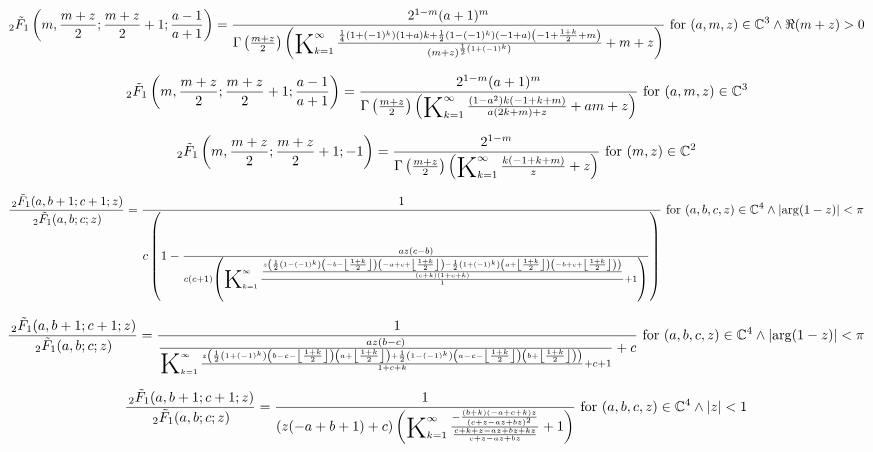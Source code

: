 \documentclass{article}
\newcommand{\bigK}{\mathop{\raisebox{-5pt}{\huge K}}}
\begin{document}
\[\, _2\tilde{F}_1\left(m,\frac{m+z}{2};\frac{m+z}{2}+1;\frac{a-1}{a+1}\right)=\frac{2^{1-m} (a+1)^m}{\Gamma \left(\frac{m+z}{2}\right) \left(\bigK_{k=1}^{\infty}\frac{\frac{1}{4} \left(1+(-1)^k\right) (1+a) k+\frac{1}{2} \left(1-(-1)^k\right) (-1+a) \left(-1+\frac{1+k}{2}+m\right)}{(m+z)^{\frac{1}{2} \left(1+(-1)^k\right)}}+m+z\right)}\text{ for }(a,m,z)\in \mathbb{C}^3\land \Re(m+z)>0\] 

\[\, _2\tilde{F}_1\left(m,\frac{m+z}{2};\frac{m+z}{2}+1;\frac{a-1}{a+1}\right)=\frac{2^{1-m} (a+1)^m}{\Gamma \left(\frac{m+z}{2}\right) \left(\bigK_{k=1}^{\infty}\frac{\left(1-a^2\right) k (-1+k+m)}{a (2 k+m)+z}+a m+z\right)}\text{ for }(a,m,z)\in \mathbb{C}^3\] 

\[\, _2\tilde{F}_1\left(m,\frac{m+z}{2};\frac{m+z}{2}+1;-1\right)=\frac{2^{1-m}}{\Gamma \left(\frac{m+z}{2}\right) \left(\bigK_{k=1}^{\infty}\frac{k (-1+k+m)}{z}+z\right)}\text{ for }(m,z)\in \mathbb{C}^2\] 

\[\frac{\, _2\tilde{F}_1(a,b+1;c+1;z)}{\, _2\tilde{F}_1(a,b;c;z)}=\frac{1}{c \left(1-\frac{a z (c-b)}{c (c+1) \left(\bigK_{k=1}^{\infty}\frac{\frac{z \left(\frac{1}{2} \left(1-(-1)^k\right) \left(-b-\left\lfloor \frac{1+k}{2}\right\rfloor \right) \left(-a+c+\left\lfloor \frac{1+k}{2}\right\rfloor \right)-\frac{1}{2} \left(1+(-1)^k\right) \left(a+\left\lfloor \frac{1+k}{2}\right\rfloor \right) \left(-b+c+\left\lfloor \frac{1+k}{2}\right\rfloor \right)\right)}{(c+k) (1+c+k)}}{1}+1\right)}\right)}\text{ for }(a,b,c,z)\in \mathbb{C}^4\land \left| \arg (1-z)\right| <\pi\] 

\[\frac{\, _2\tilde{F}_1(a,b+1;c+1;z)}{\, _2\tilde{F}_1(a,b;c;z)}=\frac{1}{\frac{a z (b-c)}{\bigK_{k=1}^{\infty}\frac{z \left(\frac{1}{2} \left(1+(-1)^k\right) \left(b-c-\left\lfloor \frac{1+k}{2}\right\rfloor \right) \left(a+\left\lfloor \frac{1+k}{2}\right\rfloor \right)+\frac{1}{2} \left(1-(-1)^k\right) \left(a-c-\left\lfloor \frac{1+k}{2}\right\rfloor \right) \left(b+\left\lfloor \frac{1+k}{2}\right\rfloor \right)\right)}{1+c+k}+c+1}+c}\text{ for }(a,b,c,z)\in \mathbb{C}^4\land \left| \arg (1-z)\right| <\pi\] 

\[\frac{\, _2\tilde{F}_1(a,b+1;c+1;z)}{\, _2\tilde{F}_1(a,b;c;z)}=\frac{1}{(z (-a+b+1)+c) \left(\bigK_{k=1}^{\infty}\frac{-\frac{(b+k) (-a+c+k) z}{(c+z-a z+b z)^2}}{\frac{c+k+z-a z+b z+k z}{c+z-a z+b z}}+1\right)}\text{ for }(a,b,c,z)\in \mathbb{C}^4\land \left| z\right| <1\] 
\end{document}

